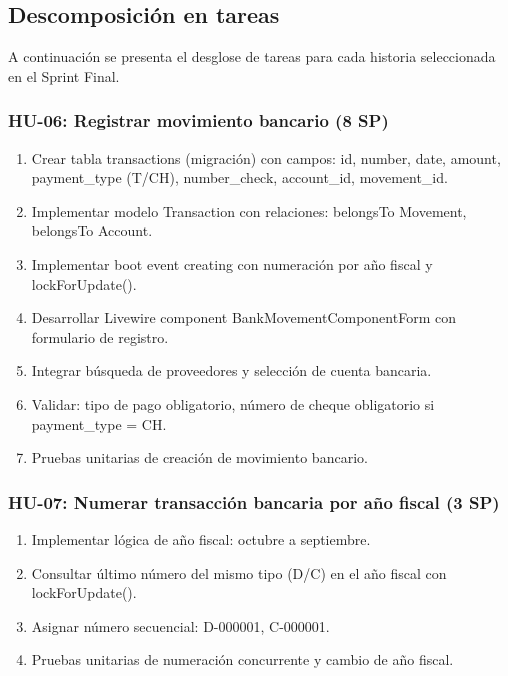 \documentclass[stu]{apa7}
\begin{document}
\subsection{Descomposición en tareas}

A continuación se presenta el desglose de tareas para cada historia seleccionada en el Sprint Final.

\subsubsection{HU-06: Registrar movimiento bancario (8 SP)}

\begin{enumerate}
    \item Crear tabla transactions (migración) con campos: id, number, date, amount, payment\_type (T/CH), number\_check, account\_id, movement\_id.
    \item Implementar modelo Transaction con relaciones: belongsTo Movement, belongsTo Account.
    \item Implementar boot event creating con numeración por año fiscal y lockForUpdate().
    \item Desarrollar Livewire component BankMovementComponentForm con formulario de registro.
    \item Integrar búsqueda de proveedores y selección de cuenta bancaria.
    \item Validar: tipo de pago obligatorio, número de cheque obligatorio si payment\_type = CH.
    \item Pruebas unitarias de creación de movimiento bancario.
\end{enumerate}

\subsubsection{HU-07: Numerar transacción bancaria por año fiscal (3 SP)}

\begin{enumerate}
    \item Implementar lógica de año fiscal: octubre a septiembre.
    \item Consultar último número del mismo tipo (D/C) en el año fiscal con lockForUpdate().
    \item Asignar número secuencial: D-000001, C-000001.
    \item Pruebas unitarias de numeración concurrente y cambio de año fiscal.
\end{enumerate}
\end{document}
